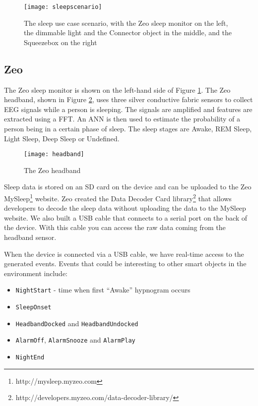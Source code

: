 \begin{figure}
\centering
\texttt{[image: sleepscenario]}
\caption{The sleep use case scenario, with the Zeo sleep monitor on the left, the dimmable light and the Connector object in the middle, and the Squeezebox on the right}
\label{sleepusecase}
\end{figure}

\subsection{Zeo}

The Zeo sleep monitor is shown on the left-hand side of Figure \ref{sleepusecase}. The Zeo headband, shown in Figure \ref{headband}, uses three silver conductive fabric sensors to collect \ac{EEG} signals while a person is sleeping. The signals are amplified and features are extracted using a \ac{FFT}. An \ac{ANN} is then used to estimate the probability of a person being in a certain phase of sleep\cite{Rubin2009}. The sleep stages are Awake, \ac{REM} Sleep, Light Sleep, Deep Sleep or Undefined. 

\begin{figure}
\centering
\texttt{[image: headband]}
\caption{The Zeo headband}
\label{headband}
\end{figure}


Sleep data is stored on an SD card on the device and can be uploaded to the Zeo MySleep\footnote{http://mysleep.myzeo.com} website. Zeo created the Data Decoder Card library\footnote{http://developers.myzeo.com/data-decoder-library/} that allows developers to decode the sleep data without uploading the data to the MySleep website. We also built a USB cable that connects to a serial port on the back of the device. With this cable you can access the raw data coming from the headband sensor. %


When the device is connected via a USB cable, we have real-time access to the generated events. Events that could be interesting to other smart objects in the environment include:

\begin{itemize}
	\item \texttt{NightStart} - time when first ``Awake'' hypnogram occurs
	\item \texttt{SleepOnset}
	\item \texttt{HeadbandDocked} and \texttt{HeadbandUndocked}
	\item \texttt{AlarmOff}, \texttt{AlarmSnooze} and \texttt{AlarmPlay}
	\item \texttt{NightEnd}
\end{itemize}

